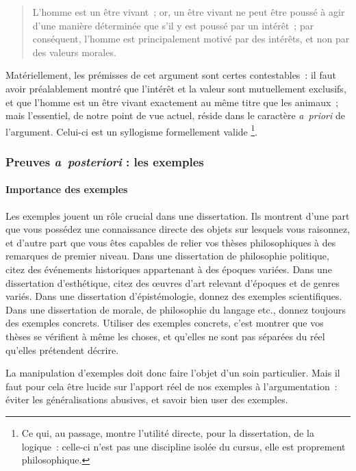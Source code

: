 \documentclass[a4paper,12pt]{article}
\begin{document}
\begin{quote}
L'homme est un être vivant ; or, un être vivant ne peut être poussé à
agir d'une manière déterminée que s'il y est poussé par un intérêt ;
par conséquent, l'homme est principalement motivé par des intérêts, et
non par des valeurs morales.
\end{quote}

Matériellement, les prémisses de cet argument sont certes contestables :
il faut avoir préalablement montré que l'intérêt et la valeur sont
mutuellement exclusifs, et que l'homme est un être vivant exactement au
même titre que les animaux ; mais l'essentiel, de notre point de vue
actuel, réside dans le caractère \emph{a priori} de l'argument. Celui-ci est
un syllogisme formellement valide \footnote{Ce qui, au passage, montre l'utilité directe, pour la dissertation,
de la logique : celle-ci n'est pas une discipline isolée du cursus,
elle est proprement philosophique.}.

\subsubsection{Preuves \emph{a posteriori} : les exemples}
\label{sec-3-3-2}

\paragraph{Importance des exemples}
\label{sec-3-3-2-1}

Les exemples jouent un rôle crucial dans une dissertation. Ils montrent
d'une part que vous possédez une connaissance directe des objets sur
lesquels vous raisonnez, et d'autre part que vous êtes capables de
relier vos thèses philosophiques à des remarques de premier niveau. Dans
une dissertation de philosophie politique, citez des événements
historiques appartenant à des époques variées. Dans une dissertation
d'esthétique, citez des œuvres d'art relevant d'époques et de genres
variés. Dans une dissertation d'épistémologie, donnez des exemples
scientifiques. Dans une dissertation de morale, de philosophie du
langage etc., donnez toujours des exemples concrets. Utiliser des
exemples concrets, c'est montrer que vos thèses se vérifient à même les
choses, et qu'elles ne sont pas séparées du réel qu'elles prétendent
décrire.

La manipulation d'exemples doit donc faire l'objet d'un soin
particulier. Mais il faut pour cela être lucide sur l'apport réel de nos
exemples à l'argumentation : éviter les généralisations abusives, et
savoir bien user des exemples.
\end{document}
